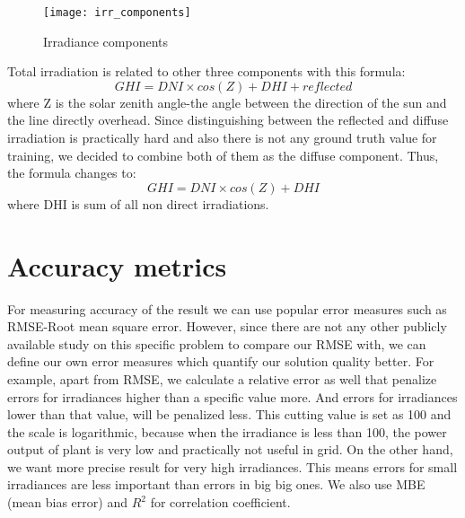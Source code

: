 \begin{figure}[h]
\caption{Irradiance components}
\label{fig:irr_comps}
\texttt{[image: irr\_components]}
\centering
\end{figure} 

Total irradiation is related to other three components with this formula:
\[ GHI = DNI \times cos (Z) + DHI + reflected \]
where Z is the solar zenith angle-the angle between the direction of the sun and the line directly overhead.
Since distinguishing between the reflected and diffuse irradiation is practically hard and also there is not any ground truth value for training, we decided to combine both of them as the diffuse component. Thus, the formula changes to:
\begin{equation}
GHI = DNI \times cos (Z) + DHI
\end{equation}
where DHI is sum of all non direct irradiations.
\section{Accuracy metrics}
For measuring accuracy of the result we can use popular error measures such as RMSE-Root mean square error. However, since there are not any other publicly available study on this specific problem to compare our RMSE with, we can define our own error measures which quantify our solution quality better. For example, apart from RMSE, we calculate a relative error as well that penalize errors for irradiances higher than a specific value more. And errors for irradiances lower than that value, will be penalized less. This cutting value is set as 100 and the scale is logarithmic, because when the irradiance is less than 100, the power output of plant is very low and practically not useful in grid. On the other hand, we want more precise result for very high irradiances. This means errors for small irradiances are less important than errors in big big ones. We also use MBE (mean bias error) and $R^2$ for correlation coefficient.


